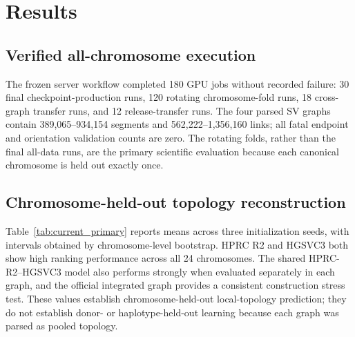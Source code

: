 \IfFileExists{ws-procs11x85.cls}{\worldscientificclasstrue\documentclass{ws-procs11x85}}{\worldscientificclassfalse\documentclass[11pt]{article}\usepackage[margin=1in]{geometry}}
\begin{document}
\section{Results}

\subsection{Verified all-chromosome execution}

The frozen server workflow completed 180 GPU jobs without recorded failure: 30
final checkpoint-production runs, 120 rotating chromosome-fold runs, 18
cross-graph transfer runs, and 12 release-transfer runs. The four parsed SV
graphs contain 389{,}065--934{,}154 segments and 562{,}222--1{,}356{,}160 links;
all fatal endpoint and orientation validation counts are zero. The rotating
folds, rather than the final all-data runs, are the primary scientific
evaluation because each canonical chromosome is held out exactly once.

\subsection{Chromosome-held-out topology reconstruction}

Table~\ref{tab:current_primary} reports means across three initialization seeds,
with intervals obtained by chromosome-level bootstrap. HPRC R2 and HGSVC3 both
show high ranking performance across all 24 chromosomes. The shared
HPRC-R2--HGSVC3 model also performs strongly when evaluated separately in each
graph, and the official integrated graph provides a consistent construction
stress test. These values establish chromosome-held-out local-topology
prediction; they do not establish donor- or haplotype-held-out learning because
each graph was parsed as pooled topology.
\end{document}
